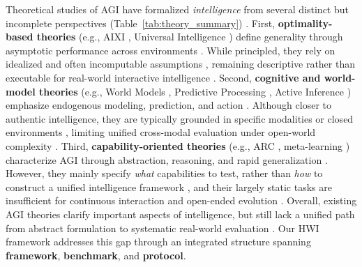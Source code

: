 Theoretical studies of AGI have formalized \emph{intelligence} from several distinct but incomplete perspectives (Table~\ref{tab:theory_summary}) \cite{legg2007collection}.
First, \textbf{optimality-based theories} (e.g., AIXI \cite{hutter2005universal}, Universal Intelligence \cite{legg2007universal}) define generality through asymptotic performance across environments \cite{sutton1998reinforcement}.
While principled, they rely on idealized and often incomputable assumptions \cite{leike2017ai}, remaining descriptive rather than executable for real-world interactive intelligence \cite{everitt2018agi}.
Second, \textbf{cognitive and world-model theories} (e.g., World Models \cite{ha2018recurrent}, Predictive Processing \cite{friston2010free}, Active Inference \cite{zhiren2026learning}) emphasize endogenous modeling, prediction, and action \cite{matsuo2022deep}.
Although closer to authentic intelligence, they are typically grounded in specific modalities or closed environments \cite{kaiser2019model}, limiting unified cross-modal evaluation under open-world complexity \cite{hafner2019dream}.
Third, \textbf{capability-oriented theories} (e.g., ARC \cite{chollet2019measure}, meta-learning \cite{finn2017model}) characterize AGI through abstraction, reasoning, and rapid generalization \cite{lake2017building}.
However, they mainly specify \emph{what} capabilities to test, rather than \emph{how} to construct a unified intelligence framework \cite{lecun2022path}, and their largely static tasks are insufficient for continuous interaction and open-ended evolution \cite{team2021open}.
Overall, existing AGI theories clarify important aspects of intelligence, but still lack a unified path from abstract formulation to systematic real-world evaluation \cite{bommasani2021opportunities}.
Our HWI framework addresses this gap through an integrated structure spanning \textbf{framework}, \textbf{benchmark}, and \textbf{protocol}.
